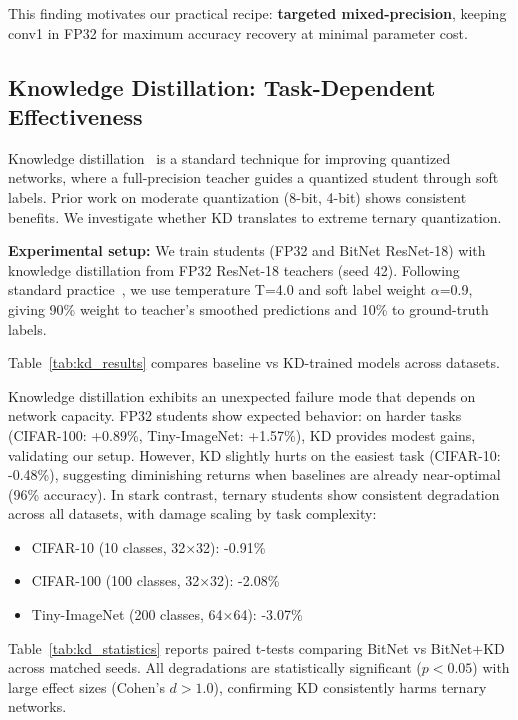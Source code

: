 This finding motivates our practical recipe: \textbf{targeted mixed-precision}, keeping conv1 in FP32 for maximum accuracy recovery at minimal parameter cost.

\subsection{Knowledge Distillation: Task-Dependent Effectiveness}
\label{sec:results:kd_investigation}

Knowledge distillation~\cite{hinton2015distilling} is a standard technique for improving quantized networks, where a full-precision teacher guides a quantized student through soft labels. Prior work on moderate quantization (8-bit, 4-bit) shows consistent benefits. We investigate whether KD translates to extreme ternary quantization.

\textbf{Experimental setup:} We train students (FP32 and BitNet ResNet-18) with knowledge distillation from FP32 ResNet-18 teachers (seed 42). Following standard practice~\cite{hinton2015distilling,kim2019qkd}, we use temperature T=4.0 and soft label weight $\alpha$=0.9, giving 90\% weight to teacher's smoothed predictions and 10\% to ground-truth labels.

Table~\ref{tab:kd_results} compares baseline vs KD-trained models across datasets.





Knowledge distillation exhibits an unexpected failure mode that depends on network capacity. FP32 students show expected behavior: on harder tasks (CIFAR-100: +0.89\%, Tiny-ImageNet: +1.57\%), KD provides modest gains, validating our setup. However, KD slightly hurts on the easiest task (CIFAR-10: -0.48\%), suggesting diminishing returns when baselines are already near-optimal (96\% accuracy). In stark contrast, ternary students show consistent degradation across all datasets, with damage scaling by task complexity:
\begin{itemize}
    \item CIFAR-10 (10 classes, 32×32): -0.91\%
    \item CIFAR-100 (100 classes, 32×32): -2.08\%
    \item Tiny-ImageNet (200 classes, 64×64): -3.07\%
\end{itemize}

Table~\ref{tab:kd_statistics} reports paired t-tests comparing BitNet vs BitNet+KD across matched seeds. All degradations are statistically significant ($p<0.05$) with large effect sizes (Cohen's $d > 1.0$), confirming KD consistently harms ternary networks.

